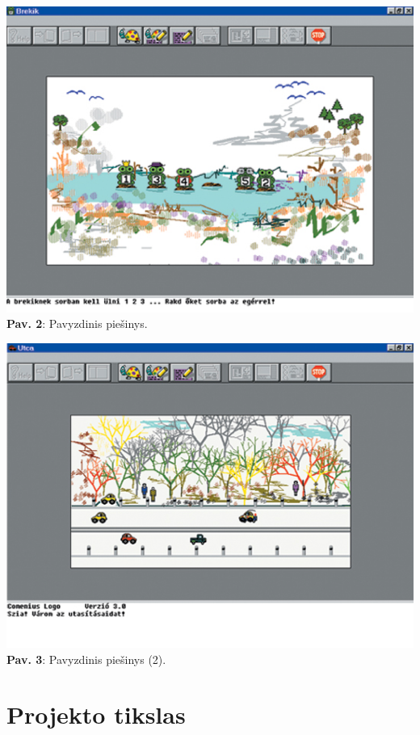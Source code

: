 \documentclass[a4paper,12pt]{article}
\begin{document}
\begin{center}
\includegraphics[scale=0.95]{LogoPiesinys1.png}\\
\textbf{Pav. 2}: Pavyzdinis piešinys.\\
\end{center}

\begin{center}
\includegraphics[scale=0.85]{LogoPiesinys2.png}\\
\textbf{Pav. 3}: Pavyzdinis piešinys (2).\\
\end{center}


\section{Projekto tikslas}
\end{document}
